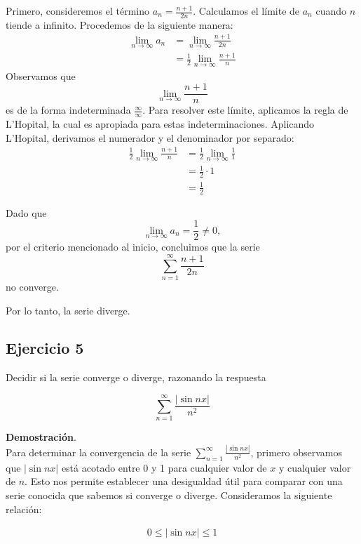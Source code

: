 \documentclass{article}
\begin{document}
    Primero, consideremos el término $a_n = \frac{n+1}{2n}$. Calculamos el límite de $a_n$ cuando $n$ tiende a infinito. Procedemos de la siguiente manera:
    \begin{align*}
    \lim _{n \rightarrow \infty} a_{n} &= \lim _{n \rightarrow \infty} \frac{n+1}{2 n}\\
    &= \frac{1}{2} \lim _{n \rightarrow \infty} \frac{n+1}{n}
    \end{align*}
    Observamos que
    \[
    \lim _{n \rightarrow \infty} \frac{n+1}{n}
    \]
    es de la forma indeterminada \(\frac{\infty}{\infty}\). Para resolver este límite, aplicamos la regla de L'Hopital, la cual es apropiada para estas indeterminaciones. Aplicando L'Hopital, derivamos el numerador y el denominador por separado:
    \begin{align*}
    \frac{1}{2} \lim _{n \rightarrow \infty} \frac{n+1}{n} &= \frac{1}{2} \lim _{n \rightarrow \infty} \frac{1}{1} \\
    &= \frac{1}{2} \cdot 1 \\
    &= \frac{1}{2}
    \end{align*}

    Dado que
    \[
    \lim _{n \rightarrow \infty} a_{n} = \frac{1}{2} \neq 0,
    \]
    por el criterio mencionado al inicio, concluimos que la serie
    \[
    \sum_{n=1}^{\infty} \frac{n+1}{2 n}
    \]
    no converge.

    Por lo tanto, la serie diverge.

    \subsection*{Ejercicio 5}

    Decidir si la serie converge o diverge, razonando la respuesta

    $$
    \sum_{n=1}^{\infty} \frac{|\sin n x|}{n^{2}}
    $$

        \textbf{Demostración}.\\

    Para determinar la convergencia de la serie $\sum_{n=1}^{\infty} \frac{|\sin n x|}{n^{2}}$, primero observamos que $|\sin n x|$ está acotado entre 0 y 1 para cualquier valor de $x$ y cualquier valor de $n$. Esto nos permite establecer una desigualdad útil para comparar con una serie conocida que sabemos si converge o diverge. Consideramos la siguiente relación:

    \begin{align*}
    0 \leq |\sin n x| \leq 1
    \end{align*}
\end{document}
